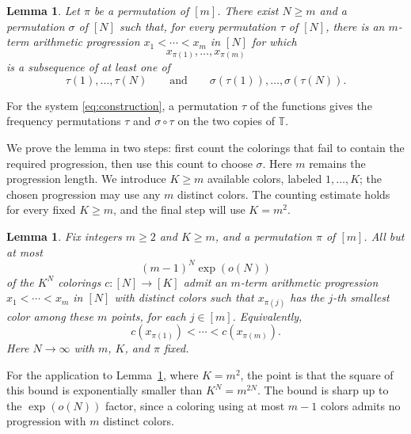 \documentclass[11pt]{article}
\newtheorem{lemma}[theorem]{Lemma}
\theoremstyle{remark}
\numberwithin{equation}{section}
\newcommand{\T}{\mathbb T}
\begin{document}
\begin{lemma}\label{lem:two}
Let $\pi$ be a permutation of $[m]$. There exist $N\geq m$ and a permutation $\sigma$ of $[N]$ such that, for every permutation $\tau$ of $[N]$, there is an $m$-term arithmetic progression $x_1<\cdots<x_m$ in $[N]$ for which
\[
 x_{\pi(1)},\ldots,x_{\pi(m)}
\]
is a subsequence of at least one of
\[
 \tau(1),\ldots,\tau(N)
 \qquad\text{and}\qquad
 \sigma(\tau(1)),\ldots,\sigma(\tau(N)).
\]
\end{lemma}

For the system \eqref{eq:construction}, a permutation $\tau$ of the functions gives the frequency permutations $\tau$ and $\sigma\circ\tau$ on the two copies of $\T$.

We prove the lemma in two steps: first count the colorings that fail to contain the required progression, then use this count to choose $\sigma$. Here $m$ remains the progression length. We introduce $K\geq m$ available colors, labeled $1,\ldots,K$; the chosen progression may use any $m$ distinct colors. The counting estimate holds for every fixed $K\geq m$, and the final step will use $K=m^2$.

\begin{lemma}\label{lem:count}
Fix integers $m\geq2$ and $K\geq m$, and a permutation $\pi$ of $[m]$. All but at most
\begin{equation}\label{eq:count}
 (m-1)^N\exp(o(N))
\end{equation}
of the $K^N$ colorings $c:[N]\to[K]$ admit an $m$-term arithmetic progression $x_1<\cdots<x_m$ in $[N]$ with distinct colors such that $x_{\pi(j)}$ has the $j$-th smallest color among these $m$ points, for each $j\in[m]$. Equivalently,
\begin{equation}\label{eq:pattern}
 c(x_{\pi(1)})<\cdots<c(x_{\pi(m)}).
\end{equation}
Here $N\to\infty$ with $m$, $K$, and $\pi$ fixed.
\end{lemma}

For the application to Lemma~\ref{lem:two}, where $K=m^2$, the point is that the square of this bound is exponentially smaller than $K^N=m^{2N}$. The bound is sharp up to the $\exp(o(N))$ factor, since a coloring using at most $m-1$ colors admits no progression with $m$ distinct colors.
\end{document}
